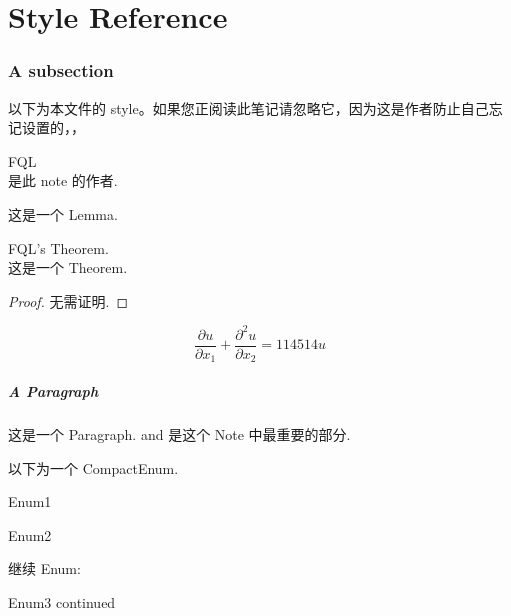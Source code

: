\chapter*{Style Reference}
\subsection{A subsection}
以下为本文件的 style。如果您正阅读此笔记请忽略它，因为这是作者防止自己忘记设置的，，
\begin{defn}
%
FQL
\\  是此 note 的作者.
\end{defn}
\begin{lemma}
    这是一个 Lemma.
\end{lemma}
\begin{theorem}
FQL's Theorem.
\\  这是一个 Theorem.
\end{theorem}
\begin{proof}
    无需证明.
\end{proof}
\begin{equation}
    \frac{\partial{u}}{\partial{x_1}} + \frac{\partial^2{u}}{\partial{x_2}} = 114514u
\end{equation}
\paragraph{A Paragraph}
这是一个 Paragraph.
 and  是这个 Note 中最重要的部分.

以下为一个 CompactEnum.
\begin{compactenumI}
    \item Enum1
    \item Enum2
\end{compactenumI}
继续 Enum:
\begin{compactenumI}[resume]
    \smallskip%
    \item Enum3 continued
\end{compactenumI}


